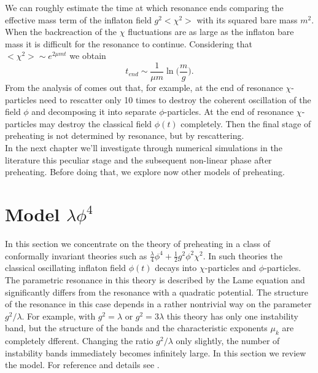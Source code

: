 \documentclass[11pt,a4paper,twoside]{book}
\begin{document}
  We can roughly estimate the time at which resonance ends comparing the effective mass term of the inflaton field $ g^{2}<\chi^{2}> $ with its squared bare mass $ m^{2} $. When the backreaction of the $\chi$ fluctuations are as large as the inflaton bare mass it is difficult for the resonance to continue. Considering that $ <\chi^{2}> \sim e^{2\mu m t} $ we obtain
 \begin{equation}
t_{end} \sim \frac{1}{\mu m}\ln\Bigg(\frac{m}{g}\Bigg).
 \end{equation}
 From the analysis of \cite{Chap4:LindePreheatingModel} comes out that, for example, at the end of resonance $\chi$-particles need to rescatter only 10 times to destroy the coherent oscillation of the field $\phi$ and decomposing it into separate $\phi$-particles. At the end of resonance $\chi$-particles may destroy the classical field $\phi(t)$ completely. Then the final stage of preheating is not determined by resonance, but by rescattering.  \\
 In the next chapter we'll investigate through numerical simulations in the literature this peculiar stage and the subsequent non-linear phase after preheating. Before doing that, we explore now other models of preheating.

 \section{Model $\lambda \phi^{4}$}
 In this section we concentrate on the theory of preheating in a class of conformally invariant theories such as $ \frac{\lambda}{4} \phi^{4} + \frac{1}{2}g^{2}\phi^{2}\chi^{2} $. In such theories the classical oscillating inflaton field $\phi(t)$ decays into $\chi$-particles and $\phi$-particles. The parametric resonance in this theory is described by the Lame equation and significantly differs from the resonance with a quadratic potential. The structure of the resonance in this case depends in a rather nontrivial way on the parameter $ g^{2}/\lambda $. For example,  with $ g^{2}=\lambda $ or $ g^{2}=3\lambda $ this theory has only one instability band, but the structure of the bands and the characteristic exponents $\mu_{k}$ are completely dfferent. Changing the ratio $ g^{2}/\lambda $ only slightly, the number of instability bands immediately becomes infinitely large.
 In this section we review the model. For reference and details see \cite{Chap4:ModelLambdaPhi4Reference}.\\
\end{document}
